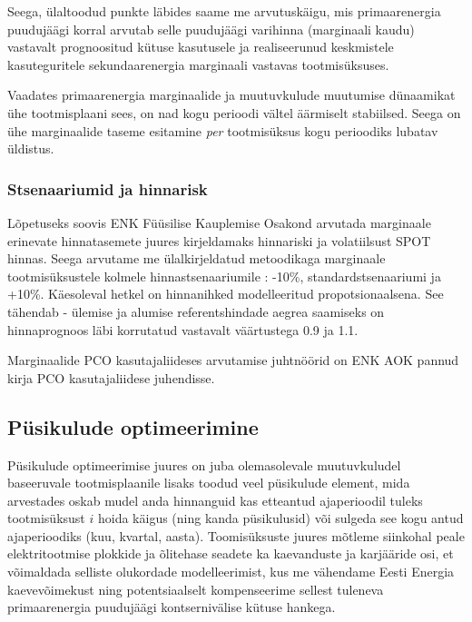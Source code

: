 \documentclass[10pt,a4paper]{article}
\begin{document}
Seega, ülaltoodud punkte läbides saame me arvutuskäigu, mis primaarenergia puudujäägi korral arvutab selle puudujäägi varihinna (marginaali kaudu) vastavalt prognoositud kütuse kasutusele ja realiseerunud keskmistele kasuteguritele sekundaarenergia marginaali vastavas tootmisüksuses.

Vaadates primaarenergia marginaalide ja muutuvkulude muutumise dü\-naami\-kat ühe tootmisplaani sees, on nad kogu perioodi vältel äärmiselt stabiilsed. Seega on ühe marginaalide taseme esitamine \emph{per} tootmisüksus kogu perioodiks lubatav üldistus.

\subsubsection{Stsenaariumid ja hinnarisk}

Lõpetuseks soovis ENK Füüsilise Kauplemise Osakond arvutada marginaale erinevate hinnatasemete juures kirjeldamaks hinnariski ja volatiilsust SPOT hinnas. Seega arvutame me ülalkirjeldatud metoodikaga marginaale tootmisüksustele kolmele hinnastsenaariumile : -10\%, standardstsenaariumi ja +10\%. Käesoleval hetkel on hinnanihked modelleeritud propotsionaalsena. See tähendab - ülemise ja alumise referentshindade aegrea saamiseks on hinnaprognoos läbi korrutatud vastavalt väärtustega 0.9 ja 1.1. 

Marginaalide PCO kasutajaliideses arvutamise juhtnöörid on ENK AOK pannud kirja PCO kasutajaliidese juhendisse.

\subsection{Püsikulude optimeerimine}
Püsikulude optimeerimise juures on juba olemasolevale muutuvkuludel baseeruvale tootmisplaanile lisaks toodud veel püsikulude element, mida arvestades oskab mudel anda hinnanguid kas etteantud ajaperioodil tuleks tootmisüksust $i$ hoida käigus (ning kanda püsikulusid) või sulgeda see kogu antud ajaperioodiks (kuu, kvartal, aasta). Toomisüksuste juures mõtleme siinkohal peale elektritootmise plokkide ja õlitehase seadete ka kaevanduste ja karjääride osi, et võimaldada selliste olukordade modelleerimist, kus me vähendame Eesti Energia kaevevõimekust ning potentsiaalselt kompenseerime sellest tuleneva primaarenergia puudujäägi kontsernivälise kütuse hankega.
\end{document}
